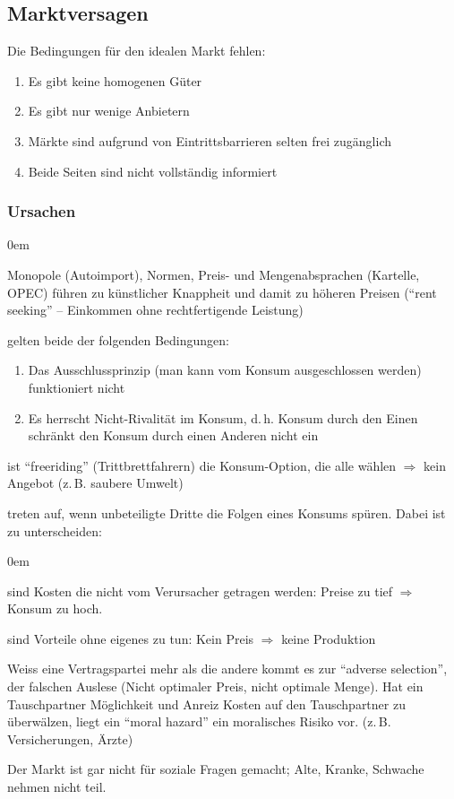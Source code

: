 \subsection{Marktversagen}
Die Bedingungen für den idealen Markt fehlen:
\begin{enumerate}\itemsep0em
	\item Es gibt keine homogenen Güter
	\item Es gibt nur wenige Anbietern
	\item Märkte sind aufgrund von Eintrittsbarrieren selten frei zugänglich
	\item Beide Seiten sind nicht vollständig informiert
\end{enumerate}

\subsubsection{Ursachen}
\begin{description}\itemsep0em
	\item [Wettbewerbsbeschränkungen] Monopole (Autoimport), Normen, Preis- und Mengenabsprachen (Kartelle, OPEC) führen zu künstlicher Knappheit
	und damit zu höheren Preisen (\enquote{rent seeking} -- Einkommen ohne rechtfertigende Leistung)
	\item [Öffentliche Güter] gelten beide der folgenden Bedingungen:
	\begin{enumerate}\itemsep0em
		\item Das Ausschlussprinzip (man kann vom Konsum ausgeschlossen werden) funktioniert nicht
		\item Es herrscht Nicht-Rivalität im Konsum, d.\,h. Konsum durch den Einen schränkt den Konsum durch einen Anderen nicht ein
	\end{enumerate}
	ist \enquote{freeriding} (Trittbrettfahrern) die Konsum-Option, die alle wählen $\Rightarrow$ kein Angebot (z.\,B. saubere Umwelt)
	\item [Externe Effekte] treten auf, wenn unbeteiligte Dritte die Folgen eines Konsums spüren. Dabei ist zu unterscheiden:
	\begin{description}\itemsep0em
		\item [Externe Kosten] sind Kosten die nicht vom Verursacher getragen werden: Preise zu tief $\Rightarrow$ Konsum zu hoch.
		\item [Externer Nutzen] sind Vorteile ohne eigenes zu tun: Kein Preis $\Rightarrow$ keine Produktion
	\end{description}
	\item[Asymmetrische Information] Weiss eine Vertragspartei mehr als die andere kommt es zur \enquote{adverse selection}, der falschen Auslese (Nicht optimaler Preis, nicht optimale Menge).
	Hat ein Tauschpartner Möglichkeit und Anreiz Kosten auf den Tauschpartner zu überwälzen, liegt ein \enquote{moral hazard} ein moralisches Risiko vor. (z.\,B. Versicherungen, Ärzte)
	\item[Soziale Fragen] Der Markt ist gar nicht für soziale Fragen gemacht; Alte, Kranke, Schwache nehmen nicht teil. 
\end{description}

